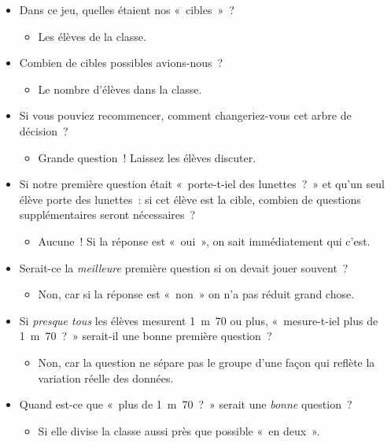 \documentclass[12pt,a4paper]{article}
\begin{document}
\begin{thinkbox}
  \begin{itemize}
    \item Dans ce jeu, quelles étaient nos «~cibles~»~?
    \begin{itemize}
      \item Les élèves de la classe.
    \end{itemize}
    \item Combien de cibles possibles avions-nous~?
    \begin{itemize}
      \item Le nombre d'élèves dans la classe.
    \end{itemize}
    \item Si vous pouviez recommencer, comment changeriez-vous cet arbre de décision~?
    \begin{itemize}
      \item Grande question~! Laissez les élèves discuter.
    \end{itemize}
    \item Si notre première question était «~porte-t-iel des lunettes~?~» et qu'un seul élève porte des lunettes~: si cet élève est la cible, combien de questions supplémentaires seront nécessaires~?
    \begin{itemize}
      \item Aucune~! Si la réponse est «~oui~», on sait immédiatement qui c'est.
    \end{itemize}
    \item Serait-ce la \emph{meilleure} première question si on devait jouer souvent~?
    \begin{itemize}
      \item Non, car si la réponse est «~non~» on n'a pas réduit grand chose.
    \end{itemize}
    \item Si \emph{presque tous} les élèves mesurent 1~m~70 ou plus, «~mesure-t-iel plus de 1~m~70~?~» serait-il une bonne première question~?
    \begin{itemize}
      \item Non, car la question ne sépare pas le groupe d'une façon qui reflète la variation réelle des données.
    \end{itemize}
    \item Quand est-ce que «~plus de 1~m~70~?~» serait une \emph{bonne} question~?
    \begin{itemize}
      \item Si elle divise la classe aussi près que possible «~en deux~».
    \end{itemize}
  \end{itemize}
\end{thinkbox}
\end{document}
